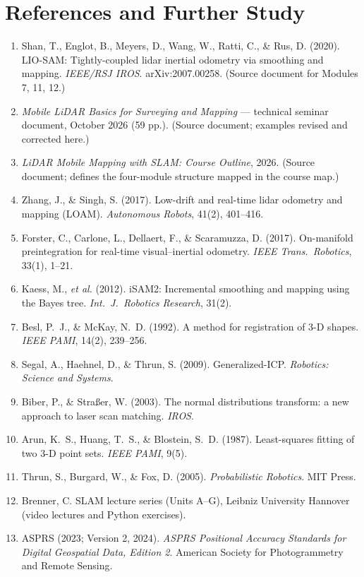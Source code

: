 \chapter{References and Further Study}
\small
\begin{enumerate}[leftmargin=*]
\item Shan, T., Englot, B., Meyers, D., Wang, W., Ratti, C., \& Rus, D. (2020). LIO-SAM: Tightly-coupled lidar inertial odometry via smoothing and mapping. \emph{IEEE/RSJ IROS}. arXiv:2007.00258. (Source document for Modules 7, 11, 12.)
\item \emph{Mobile LiDAR Basics for Surveying and Mapping} --- technical seminar document, October 2026 (59 pp.). (Source document; examples revised and corrected here.)
\item \emph{LiDAR Mobile Mapping with SLAM: Course Outline}, 2026. (Source document; defines the four-module structure mapped in the course map.)
\item Zhang, J., \& Singh, S. (2017). Low-drift and real-time lidar odometry and mapping (LOAM). \emph{Autonomous Robots}, 41(2), 401--416.
\item Forster, C., Carlone, L., Dellaert, F., \& Scaramuzza, D. (2017). On-manifold preintegration for real-time visual--inertial odometry. \emph{IEEE Trans.\ Robotics}, 33(1), 1--21.
\item Kaess, M., \emph{et al.} (2012). iSAM2: Incremental smoothing and mapping using the Bayes tree. \emph{Int.\ J.\ Robotics Research}, 31(2).
\item Besl, P.\ J., \& McKay, N.\ D. (1992). A method for registration of 3-D shapes. \emph{IEEE PAMI}, 14(2), 239--256.
\item Segal, A., Haehnel, D., \& Thrun, S. (2009). Generalized-ICP. \emph{Robotics: Science and Systems}.
\item Biber, P., \& Stra{\ss}er, W. (2003). The normal distributions transform: a new approach to laser scan matching. \emph{IROS}.
\item Arun, K.\ S., Huang, T.\ S., \& Blostein, S.\ D. (1987). Least-squares fitting of two 3-D point sets. \emph{IEEE PAMI}, 9(5).
\item Thrun, S., Burgard, W., \& Fox, D. (2005). \emph{Probabilistic Robotics}. MIT Press.
\item Brenner, C. SLAM lecture series (Units A--G), Leibniz University Hannover (video lectures and Python exercises).
\item ASPRS (2023; Version 2, 2024). \emph{ASPRS Positional Accuracy Standards for Digital Geospatial Data, Edition 2}. American Society for Photogrammetry and Remote Sensing.

\end{enumerate}
